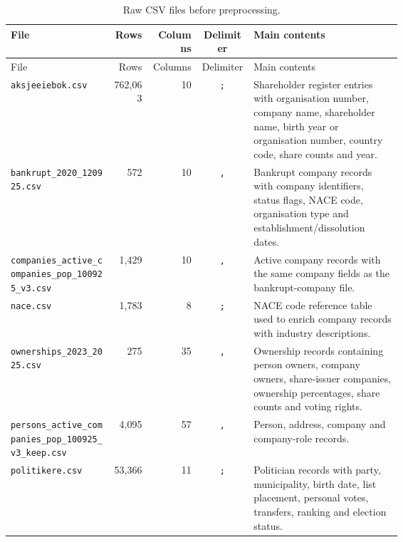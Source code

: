 
\begin{longtable}{P{0.26\linewidth}rrcP{0.38\linewidth}}
\caption{Raw CSV files before preprocessing.}
\label{tab:appendix-raw-csv-files}\\
\toprule
File & Rows & Columns & Delimiter & Main contents \\
\midrule
\endfirsthead
\toprule
File & Rows & Columns & Delimiter & Main contents \\
\midrule
\endhead
\bottomrule
\endfoot
\texttt{aksjeeiebok.csv} & 762,063 & 10 & \texttt{;} & Shareholder register entries with organisation number, company name, shareholder name, birth year or organisation number, country code, share counts and year. \\
\texttt{bankrupt\_2020\_120925.csv} & 572 & 10 & \texttt{,} & Bankrupt company records with company identifiers, status flags, NACE code, organisation type and establishment/dissolution dates. \\
\texttt{companies\_active\_companies\_pop\_100925\_v3.csv} & 1,429 & 10 & \texttt{,} & Active company records with the same company fields as the bankrupt-company file. \\
\texttt{nace.csv} & 1,783 & 8 & \texttt{;} & NACE code reference table used to enrich company records with industry descriptions. \\
\texttt{ownerships\_2023\_2025.csv} & 275 & 35 & \texttt{,} & Ownership records containing person owners, company owners, share-issuer companies, ownership percentages, share counts and voting rights. \\
\texttt{persons\_active\_companies\_pop\_100925\_v3\_keep.csv} & 4,095 & 57 & \texttt{,} & Person, address, company and company-role records. \\
\texttt{politikere.csv} & 53,366 & 11 & \texttt{;} & Politician records with party, municipality, birth date, list placement, personal votes, transfers, ranking and election status. \\
\end{longtable}

